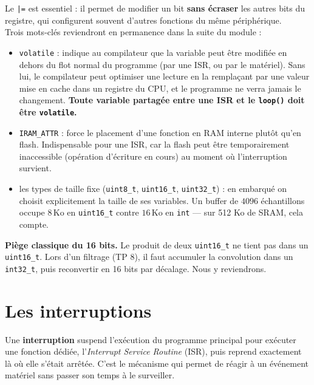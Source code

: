 Le \texttt{|=} est essentiel : il permet de modifier un bit \textbf{sans écraser} les autres bits du registre, qui configurent souvent d'autres fonctions du même périphérique.\\

Trois mots-clés reviendront en permanence dans la suite du module :

\begin{itemize}
    \item \texttt{volatile} : indique au compilateur que la variable peut être modifiée en dehors du flot normal du programme (par une ISR, ou par le matériel). Sans lui, le compilateur peut optimiser une lecture en la remplaçant par une valeur mise en cache dans un registre du CPU, et le programme ne verra jamais le changement. \textbf{Toute variable partagée entre une ISR et le \texttt{loop()} doit être \texttt{volatile}.}
    \item \texttt{IRAM\_ATTR} : force le placement d'une fonction en RAM interne plutôt qu'en flash. Indispensable pour une ISR, car la flash peut être temporairement inaccessible (opération d'écriture en cours) au moment où l'interruption survient.
    \item les types de taille fixe (\texttt{uint8\_t}, \texttt{uint16\_t}, \texttt{uint32\_t}) : en embarqué on choisit explicitement la taille de ses variables. Un buffer de $4096$ échantillons occupe $8\,\mathrm{Ko}$ en \texttt{uint16\_t} contre $16\,\mathrm{Ko}$ en \texttt{int} — sur 512 Ko de SRAM, cela compte.
\end{itemize}

\begin{imp}
\textbf{Piège classique du 16 bits.} Le produit de deux \texttt{uint16\_t} ne tient pas dans un \texttt{uint16\_t}. Lors d'un filtrage (TP 8), il faut accumuler la convolution dans un \texttt{int32\_t}, puis reconvertir en 16 bits par décalage. Nous y reviendrons.
\end{imp}

\newpage

\section{Les interruptions}

Une \textbf{interruption} suspend l'exécution du programme principal pour exécuter une fonction dédiée, l'\textit{Interrupt Service Routine} (ISR), puis reprend exactement là où elle s'était arrêtée. C'est le mécanisme qui permet de réagir à un événement matériel sans passer son temps à le surveiller.\\

